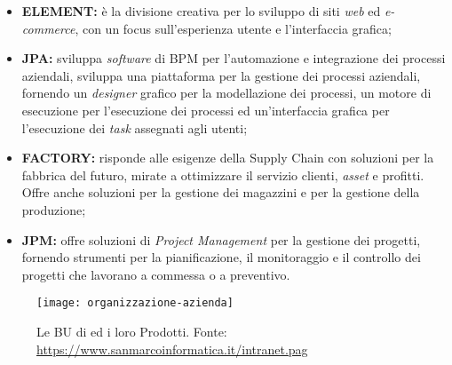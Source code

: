 \begin{itemize}
\item \textbf{ELEMENT:} è la divisione creativa per lo sviluppo di siti \textit{web} ed \textit{e-commerce}, con un focus sull'esperienza utente e l'interfaccia grafica;
\item \textbf{JPA:} sviluppa \textit{software} di \gls{BPM} per l'automazione e integrazione dei processi aziendali, sviluppa una piattaforma per la gestione dei processi aziendali, fornendo un \textit{designer}  grafico per la modellazione dei processi, un motore di esecuzione per l'esecuzione dei processi ed un'interfaccia grafica per l'esecuzione dei \textit{task} assegnati agli utenti;
\item \textbf{FACTORY:} risponde alle esigenze della \gls{Supply Chain} con soluzioni per la fabbrica del futuro, mirate a ottimizzare il servizio clienti, \textit{asset} e profitti. Offre anche soluzioni per la gestione dei magazzini e per la gestione della produzione; 
\item \textbf{JPM:} offre soluzioni di \textit{\gls{Project Management}} per la gestione dei progetti, fornendo strumenti per la pianificazione, il monitoraggio e il controllo dei progetti che lavorano a commessa o a preventivo.
\end{itemize}

\begin{figure}[!h] 
  \centering 
  \texttt{[image: organizzazione-azienda]} 
  \caption{Le BU di {\azienda} ed i loro Prodotti. Fonte: \url{https://www.sanmarcoinformatica.it/intranet.pag}}
  \label{fig:organizzazione-azienda}
\end{figure}


